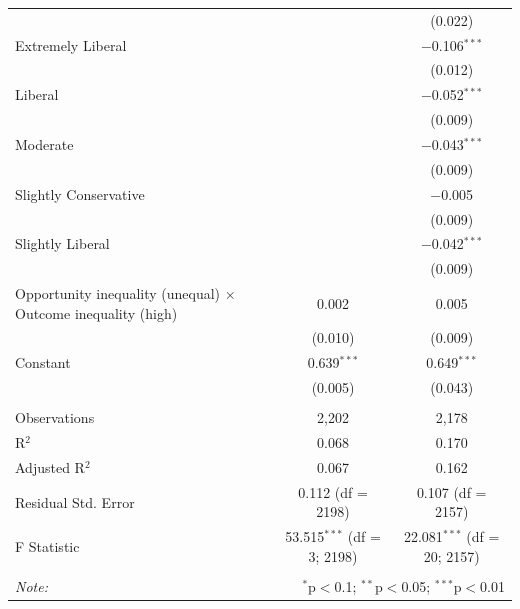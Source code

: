 \begin{table}[H]
\begin{tabular}{@{\extracolsep{5pt}}lcc}
  &  & (0.022) \\ 
  Extremely Liberal &  & $-$0.106$^{***}$ \\ 
  &  & (0.012) \\ 
  Liberal &  & $-$0.052$^{***}$ \\ 
  &  & (0.009) \\ 
  Moderate &  & $-$0.043$^{***}$ \\ 
  &  & (0.009) \\ 
  Slightly Conservative &  & $-$0.005 \\ 
  &  & (0.009) \\ 
  Slightly Liberal &  & $-$0.042$^{***}$ \\ 
  &  & (0.009) \\ 
  Opportunity inequality (unequal) × Outcome inequality (high) & 0.002 & 0.005 \\ 
  & (0.010) & (0.009) \\ 
  Constant & 0.639$^{***}$ & 0.649$^{***}$ \\ 
  & (0.005) & (0.043) \\ 
 \hline \\[-1.8ex] 
Observations & 2,202 & 2,178 \\ 
R$^{2}$ & 0.068 & 0.170 \\ 
Adjusted R$^{2}$ & 0.067 & 0.162 \\ 
Residual Std. Error & 0.112 (df = 2198) & 0.107 (df = 2157) \\ 
F Statistic & 53.515$^{***}$ (df = 3; 2198) & 22.081$^{***}$ (df = 20; 2157) \\ 
\hline 
\hline \\[-1.8ex] 
\textit{Note:}  & \multicolumn{2}{r}{$^{*}$p$<$0.1; $^{**}$p$<$0.05; $^{***}$p$<$0.01} \\ 
\end{tabular} 
\end{table} 
